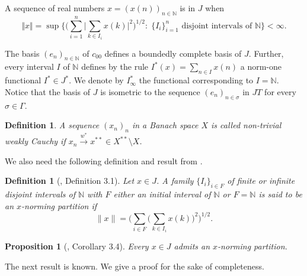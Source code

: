 \documentclass[12pt]{amsart}
\theoremstyle{plain}
\numberwithin{equation}{section}
\newcommand{\N}{\mathbb{N}}
\newcommand{\s}{\sigma}
\newtheorem{definition}[theorem]{Definition}
\newtheorem{proposition}[theorem]{Proposition}
\begin{document}
A sequence of real numbers $x = (x(n))_{n\in \N}$ is in $J$ when
\begin{equation}\label{eq:Jnorm}
\Vert x \Vert= \sup \biggl\{\biggl( \sum_{i=1}^{n} \Big| \sum _{k \in I_{i} }x(k)\Big|^2 \biggr)^{1/2} :\; \{ I_i \}_{i=1}^n \text{ disjoint intervals of } \N \biggr \} <\infty.
\end{equation}

The basis $(e_n)_{n \in \N}$ of $c_{00}$ defines a boundedly complete basis of $J$. Further, every interval $I$ of $\N$ defines by the rule $I^*(x) = \sum_{n\in I} x(n)$ a norm-one functional $I^* \in J^*$. We denote by $I_{\infty}^*$ the functional corresponding to $I= \N$.
Notice that the basis of $J$ is isometric to the sequence $(e_n)_{n\in \s}$ in $JT$ for every $\s \in \Gamma$.

\begin{definition}
A sequence $(x_n)_n$ in a Banach space $X$ is called non-trivial weakly Cauchy if $x_n\xrightarrow{w^*} x^{**} \in X^{**} \setminus X$.
\end{definition}

We also need the following definition and result from \cite{AG}.

\begin{definition}[\cite{AG}, Definition 3.1]
Let $x\in J$. A family $\{I_i\}_{i\in F}$ of finite or infinite disjoint intervals of $\N$ with $F$ either an initial interval of $\N$ or $F=\N$ is said to be an $x$-norming partition if
\[ \| x\| = \Big( \sum_{i\in F} \Big( \sum_{k\in I_i} x(k) \Big)^2 \Big)^{1/2}. \]
\end{definition}

\begin{proposition}[\cite{AG}, Corollary 3.4]  \label{AG1}
Every $x \in J$ admits an $x$-norming partition.
\end{proposition}

The next result is known. We give a proof for the sake of completeness.
\end{document}
